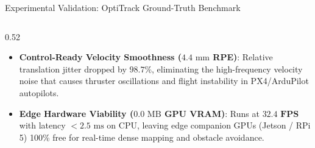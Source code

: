 \documentclass[aspectratio=169, 10pt]{beamer}
\begin{document}
\begin{frame}{Experimental Validation: OptiTrack Ground-Truth Benchmark}
\begin{columns}[T]
\begin{column}{0.52\textwidth}
\begin{itemize}
        \item \textbf{Control-Ready Velocity Smoothness ($4.4\text{ mm}$ RPE)}:
          Relative translation jitter dropped by $\mathbf{98.7\%}$, eliminating the high-frequency velocity noise that causes thruster oscillations and flight instability in PX4/ArduPilot autopilots.

        \item \textbf{Edge Hardware Viability ($0.0\text{ MB}$ GPU VRAM)}:
          Runs at $\mathbf{32.4\text{ FPS}}$ with latency $< 2.5\text{ ms}$ on CPU, leaving edge companion GPUs (Jetson / RPi 5) 100\% free for real-time dense mapping and obstacle avoidance.
      \end{itemize}
    \end{column}
  \end{columns}
\end{frame}
\end{document}
